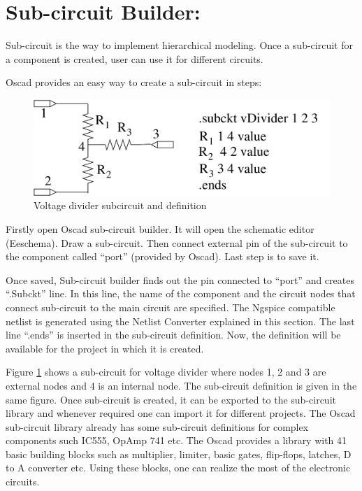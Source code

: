 \section {Sub-circuit Builder:}
Sub-circuit is the way to implement hierarchical modeling. Once a sub-circuit for a component is created, user can use it for different circuits.

Oscad provides an easy way to create a sub-circuit in steps: 


\begin{figure}[h]%
\begin{center}
\includegraphics[width=1\linewidth]{figures/voltage-divider.png}%
\caption{Voltage divider subcircuit and definition}
\label{vsub}
\end{center}
\end{figure}

Firstly open Oscad sub-circuit builder. It will open the schematic editor (Eeschema).  Draw a sub-circuit. Then connect external pin of the sub-circuit to the component called “port” (provided by Oscad). Last step is to save it. 

Once saved, Sub-circuit builder finds out the pin connected to “port” and creates “.Subckt” line. In this line, the name of the component and the circuit nodes that connect sub-circuit to the main circuit are specified. The Ngspice compatible netlist is generated using the Netlist Converter 
explained in this section. The last line “.ends” is inserted in the sub-circuit definition. Now, the definition will be available for the project in which it is created. 

Figure \ref{vsub} shows a sub-circuit for voltage divider where nodes 1, 2 and 3 are external nodes and 4 is an internal node. The sub-circuit definition is given in the same figure. Once sub-circuit is created, it can be exported to the sub-circuit library and whenever required one can import it for different projects. The Oscad sub-circuit library already has some sub-circuit definitions for complex components such IC555, OpAmp 741 etc. The Oscad provides a library with 41 basic building blocks such as multiplier, limiter, basic gates, flip-flops, latches, D to A converter etc. Using these blocks, one can realize the most of the electronic circuits. 

